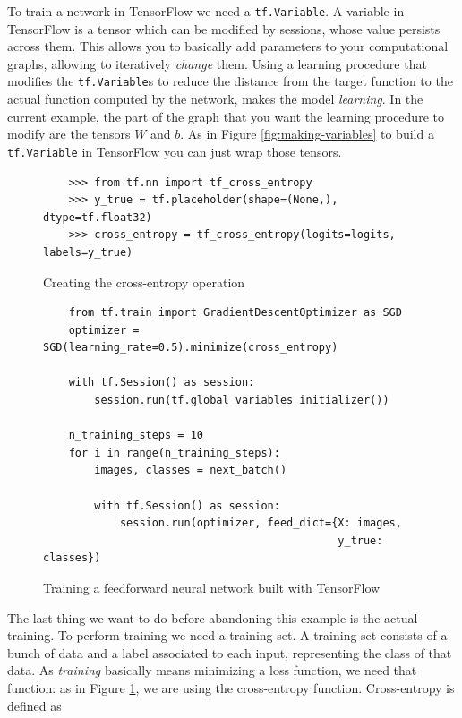 To train a network in TensorFlow we need a \texttt{tf.Variable}. A
variable in TensorFlow is a tensor which can be modified by sessions,
whose value persists across them. This allows you to basically add
parameters to your computational graphs, allowing to iteratively
\emph{change} them. Using a learning procedure that modifies the
\texttt{tf.Variable}s to reduce the distance from the target function
to the actual function computed by the network, makes the model
\emph{learning}. In the current example, the part of the graph that you
want the learning procedure to modify are the tensors $W$ and $b$. As
in Figure \ref{fig:making-variables} to build a \texttt{tf.Variable} in
TensorFlow you can just wrap those tensors.

\begin{figure}
  \begin{verbatim}
    >>> from tf.nn import tf_cross_entropy
    >>> y_true = tf.placeholder(shape=(None,), dtype=tf.float32)
    >>> cross_entropy = tf_cross_entropy(logits=logits, labels=y_true)
  \end{verbatim}
  \caption{Creating the cross-entropy operation}
  \label{fig:cross-entropy}
\end{figure}

\begin{figure}
  \begin{verbatim}
    from tf.train import GradientDescentOptimizer as SGD
    optimizer = SGD(learning_rate=0.5).minimize(cross_entropy)

    with tf.Session() as session:
        session.run(tf.global_variables_initializer())

    n_training_steps = 10
    for i in range(n_training_steps):
        images, classes = next_batch()

        with tf.Session() as session:
            session.run(optimizer, feed_dict={X: images,
                                              y_true: classes})
  \end{verbatim}
  \caption{Training a feedforward neural network built with TensorFlow}
  \label{fig:training-network}
\end{figure}

The last thing we want to do before abandoning this example is the
actual training. To perform training we need a training set. A training
set consists of a bunch of data and a label associated to each input,
representing the class of that data. As \emph{training} basically means
minimizing a loss function, we need that function: as in Figure
\ref{fig:cross-entropy}, we are using the cross-entropy function.
Cross-entropy is defined as


